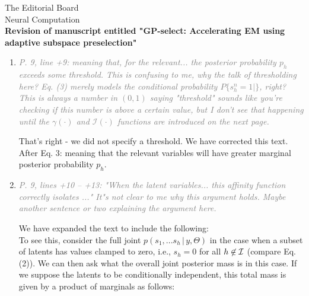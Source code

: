 \documentclass[10pt]{letter}
\newcommand{\rvr}[1]{\textcolor{gray}{#1}}
\renewcommand{\vec}[1]{{\mathbf{#1}}}
\newcommand{\II}{{\cal I}}
\begin{document}
\begin{letter}{
The Editorial Board\\
Neural Computation\\
\vspace{10mm}
\textbf{Revision of manuscript entitled "GP-select: Accelerating EM using adaptive
subspace preselection"}
}
\begin{enumerate}[topsep=3pt,itemsep=2ex,partopsep=1ex,parsep=1ex]
    \item \rvr{\emph{P. 9, line +9:   meaning that, for the relevant... the posterior probability $p_h$ exceeds some threshold.  This is confusing to me, why the talk of thresholding here? Eq. (3) merely models the conditional probability $P\{ s_h^n = 1 |   \}$, right? This is always a number in $(0,1)$ saying "threshold"  sounds like you're checking if this number is above a certain value, but I don't see that happening until the $\gamma( \cdot )$ and $\mathcal{I}( \cdot )$ functions are introduced on the next page.}}

That’s right - we did not specify a threshold. We have corrected this text. 
After Eq. 3: meaning that the relevant variables will have greater marginal posterior probability $p_h$.

    \item \rvr{\emph{P. 9, lines +10 -- +13: "When the latent variables... this affinity function correctly isolates ..."  It"s not clear to me why this argument holds. Maybe another sentence or two explaining the argument here.}}

We have expanded the text to include the following:\\
%
%

To see this, consider the full joint $p(s_1,...s_h \,|\, y,\Theta)$ in the case when a subset of latents has values clamped to zero, i.e., $s_h=0$ for all $h\not\in\II$ (compare Eq. (2)). We can then ask what the overall joint posterior mass is in this case. If we suppose the latents to be conditionally independent, this total mass is given by a product of marginals as follows:


\end{enumerate}
\end{letter}
\end{document}

